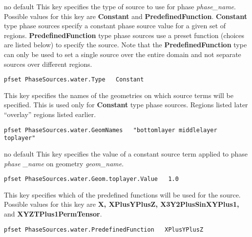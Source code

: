 {no default}
{This key specifies the type of source to use for phase {\em phase\_name}.
Possible values for this key are {\bf Constant} and {\bf PredefinedFunction}.
{\bf Constant} type phase sources specify a constant phase source
value for a given set of regions.
{\bf PredefinedFunction} type phase sources use a preset function
(choices are listed below) to specify the source.  Note that the
{\bf PredefinedFunction} type can only be used to set a single source
over the entire domain and not separate sources over different regions.
}
\begin{display}\begin{verbatim}
pfset PhaseSources.water.Type   Constant
\end{verbatim}\end{display}


{This key specifies the names of the geometries on which source terms will be
specified.  This is used only for {\bf Constant} type phase sources.
Regions listed later ``overlay'' regions listed earlier.
}
\begin{display}\begin{verbatim}
pfset PhaseSources.water.GeomNames   "bottomlayer middlelayer toplayer"
\end{verbatim}\end{display}

{no default}
{This key specifies the value of a constant source term applied to phase
{\em phase \_name} on geometry {\em geom\_name}.
}
\begin{display}\begin{verbatim}
pfset PhaseSources.water.Geom.toplayer.Value   1.0
\end{verbatim}\end{display}


{This key specifies which of the predefined functions will be used for the
source.
Possible values for this key are {\bf X, XPlusYPlusZ, X3Y2PlusSinXYPlus1,}
 and {\bf
XYZTPlus1PermTensor}.
}
\begin{display}\begin{verbatim}
pfset PhaseSources.water.PredefinedFunction   XPlusYPlusZ
\end{verbatim}\end{display}

